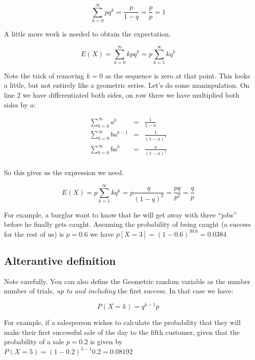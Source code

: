 \documentclass[12pt]{extbook}
\begin{document}
\begin{displaymath}
\sum_{k=0}^{\infty} pq^k = \frac{p}{1-q} = \frac{p}{p} = 1
\end{displaymath}


A little more work is needed to obtain the expectation.

\begin{displaymath}
E(X) = \sum_{k=0}^{\infty} k p q^k =  p \sum_{k=1}^{\infty} k q^k
\end{displaymath}

Note the trick of removing $k=0$ as the sequence is zero at that point.   This looks a little, but not entirely like a geometric series.   Let's do some maninpulation.  On line 2 we have differentiated both sides, on row three we have multiplied both sides by $a$:

\begin{eqnarray*}
\sum_{b=0}^{\infty} a^b &=& \frac{1}{1-a} \\
\sum_{b=0}^{\infty} b a^{b-1} &=& \frac{1}{(1-a)^2} \\
\sum_{b=0}^{\infty} b a^{b} &=& \frac{a}{(1-a)^2} \\
\end{eqnarray*}

So this gives us the expression we need.

\begin{displaymath}
 E(X) = p \sum_{k=1}^{\infty} k q^k = p \frac{q}{(1-q)^2} = \frac{pq}{p^2} = \frac{q}{p}
\end{displaymath}


For example, a burglar want to know that he will get away with three ``jobs'' before he finally gets caught.  Assuming the probability of being caught (a success for the rest of us) is $p=0.6$ we have $p[X=3]=(1-0.6)^30.6=0.0384$


\subsection{Alterantive definition}
  

Note carefully.   You can also define the Geometric random variable as the number number of trials, \emph{up to and including} the first success.   In that case we have:

\begin{displaymath}
P(X=k) = q^{k-1}p
\end{displaymath}


For example, if a salesperson wishes to calculate the probability that they will make their first successful sale of the day to the fifth customer, given that the probability of a sale $p=0.2$ is given by $P(X=5)=(1-0.2)^{5-1}0.2 = 0.08192$
\end{document}
